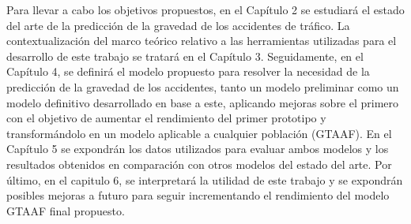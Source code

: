 Para llevar a cabo los objetivos propuestos, en el Capítulo 2 se estudiará el estado del arte de la predicción de la gravedad de los accidentes de tráfico. La contextualización del marco teórico relativo a las herramientas utilizadas para el desarrollo de este trabajo se tratará en el Capítulo 3. Seguidamente, en el Capítulo 4, se definirá el modelo propuesto para resolver la necesidad de la predicción de la gravedad de los accidentes, tanto un modelo preliminar como un modelo definitivo desarrollado en base a este, aplicando mejoras sobre el primero con el objetivo de aumentar el rendimiento del primer prototipo y transformándolo en un modelo aplicable a cualquier población (GTAAF). En el Capítulo 5 se expondrán los datos utilizados para evaluar ambos modelos y los resultados obtenidos en comparación con otros modelos del estado del arte. Por último, en el capitulo 6, se interpretará la utilidad de este trabajo y se expondrán posibles mejoras a futuro para seguir incrementando el rendimiento del modelo GTAAF final propuesto.

